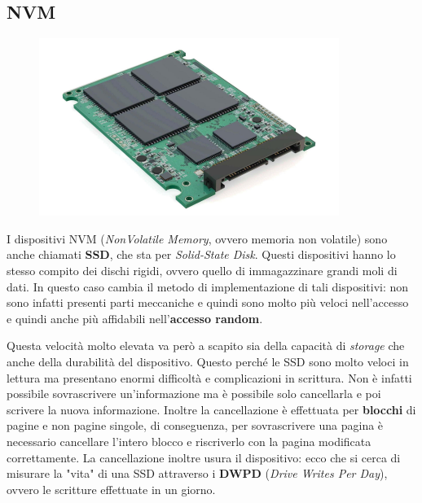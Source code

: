 % 
\subsection{NVM}\label{NVM}
\begin{figure}
  \includegraphics[width = \linewidth]{../res/imgs/mass memory/NVM.png}
  \label{fig:NVM}
\end{figure}
I dispositivi NVM (\textit{NonVolatile Memory}, ovvero memoria non volatile) sono anche chiamati \textbf{SSD}, che sta per \textit{Solid-State Disk}. Questi dispositivi hanno lo stesso compito dei dischi rigidi, ovvero quello di immagazzinare grandi moli di dati. In questo caso cambia il metodo di implementazione di tali dispositivi: non sono infatti presenti parti meccaniche e quindi sono molto più veloci nell'accesso e quindi anche più affidabili nell'\textbf{accesso random}.

Questa velocità molto elevata va però a scapito sia della capacità di \textit{storage} che anche della durabilità del dispositivo. Questo perché le SSD sono molto veloci in lettura ma presentano enormi difficoltà e complicazioni in scrittura. Non è infatti possibile sovrascrivere un'informazione ma è possibile solo cancellarla e poi scrivere la nuova informazione. Inoltre la cancellazione è effettuata per \textbf{blocchi} di pagine e non pagine singole, di conseguenza, per sovrascrivere una pagina è necessario cancellare l'intero blocco e riscriverlo con la pagina modificata correttamente. La cancellazione inoltre usura il dispositivo: ecco che si cerca di misurare la "vita" di una SSD attraverso i \textbf{DWPD} (\textit{Drive Writes Per Day}), ovvero le scritture effettuate in un giorno.

